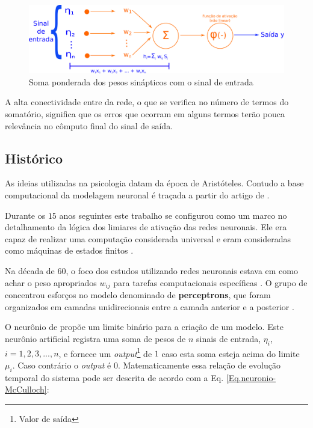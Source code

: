 \begin{figure}[H]
	\centering
	\includegraphics[width=1.2\textwidth]{Imagens/Fig8.png}
	\caption{Soma ponderada dos pesos sinápticos com o sinal de entrada}
	\label{MCN}
\end{figure} 

A alta conectividade entre da rede, o que se verifica no número de termos do somatório, significa que os erros que ocorram em alguns termos terão pouca relevância no cômputo final do sinal de saída.  

\subsection{Histórico}

As ideias utilizadas na psicologia datam da época de Aristóteles. Contudo a base computacional da modelagem neuronal é traçada a partir do artigo de \citet{McCulloch1943}. 

Durante os $15$ anos seguintes este trabalho se configurou como um marco no detalhamento da lógica dos limiares de ativação das redes neuronais. Ele era capaz de realizar uma computação considerada universal e eram consideradas como máquinas de estados finitos \citep{Misky1969}. 

Na década de $60$, o foco dos estudos utilizando redes neuronais estava em como achar o peso apropriados $w_{ij}$ para tarefas computacionais específicas \citep{Rosenblatt1962}. O grupo de \citet{Rosenblatt1962} concentrou esforços no modelo denominado de \textbf{perceptrons}, que foram organizados em camadas unidirecionais entre a camada anterior e a posterior \citep{Hertz1990}.


O neurônio de \citet{McCulloch1943} propõe um limite binário para a criação de um modelo. Este neurônio artificial registra uma soma de pesos de $n$ sinais de entrada, $\eta_{i}$, $i=1,2,3,...,n$, e fornece um \textit{output}\footnote{Valor de saída} de $1$ caso esta soma esteja acima do limite $\mu_{i}$. Caso contrário o \textit{output} é $0$. Matematicamente essa relação de evolução temporal do sistema pode ser descrita de acordo com a Eq. \ref{Eq.neuronio-McCulloch}:


